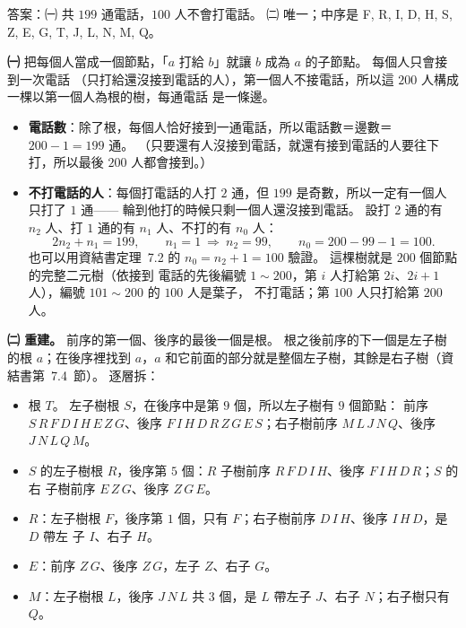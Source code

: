 \begin{pastsoln}
答案：㈠ 共 $199$ 通電話，$100$ 人不會打電話。 ㈡ 唯一；中序是 F, R, I, D, H, S, Z, E, G, T, J, L, N, M, Q。

\textbf{㈠} 把每個人當成一個節點，「$a$ 打給 $b$」就讓 $b$ 成為 $a$ 的子節點。 每個人只會接到一次電話
（只打給還沒接到電話的人），第一個人不接電話，所以這 $200$ 人構成一棵以第一個人為根的樹，每通電話
是一條邊。
\begin{itemize}
\item \textbf{電話數}：除了根，每個人恰好接到一通電話，所以電話數＝邊數＝$200 - 1 = 199$ 通。
（只要還有人沒接到電話，就還有接到電話的人要往下打，所以最後 $200$ 人都會接到。）
\item \textbf{不打電話的人}：每個打電話的人打 $2$ 通，但 $199$ 是奇數，所以一定有一個人只打了 $1$ 通——
輪到他打的時候只剩一個人還沒接到電話。 設打 $2$ 通的有 $n_2$ 人、打 $1$ 通的有 $n_1$ 人、不打的有
$n_0$ 人：
\[
2n_2 + n_1 = 199,\qquad n_1 = 1 \ \Rightarrow\ n_2 = 99,\qquad n_0 = 200 - 99 - 1 = 100.
\]
也可以用資結書定理~7.2 的 $n_0 = n_2 + 1 = 100$ 驗證。 這棵樹就是 $200$ 個節點的完整二元樹（依接到
電話的先後編號 $1 \sim 200$，第 $i$ 人打給第 $2i$、$2i+1$ 人），編號 $101 \sim 200$ 的 $100$ 人是葉子，
不打電話；第 $100$ 人只打給第 $200$ 人。
\end{itemize}

\textbf{㈡ 重建。} 前序的第一個、後序的最後一個是根。 根之後前序的下一個是左子樹的根 $a$；在後序裡找到
$a$，$a$ 和它前面的部分就是整個左子樹，其餘是右子樹（資結書第~7.4~節）。 逐層拆：
\begin{itemize}
\item 根 $T$。 左子樹根 $S$，在後序中是第 $9$ 個，所以左子樹有 $9$ 個節點：
前序 $S\,R\,F\,D\,I\,H\,E\,Z\,G$、後序 $F\,I\,H\,D\,R\,Z\,G\,E\,S$；右子樹前序 $M\,L\,J\,N\,Q$、後序
$J\,N\,L\,Q\,M$。
\item $S$ 的左子樹根 $R$，後序第 $5$ 個：$R$ 子樹前序 $R\,F\,D\,I\,H$、後序 $F\,I\,H\,D\,R$；$S$ 的右
子樹前序 $E\,Z\,G$、後序 $Z\,G\,E$。
\item $R$：左子樹根 $F$，後序第 $1$ 個，只有 $F$；右子樹前序 $D\,I\,H$、後序 $I\,H\,D$，是 $D$ 帶左
子 $I$、右子 $H$。
\item $E$：前序 $Z\,G$、後序 $Z\,G$，左子 $Z$、右子 $G$。
\item $M$：左子樹根 $L$，後序 $J\,N\,L$ 共 $3$ 個，是 $L$ 帶左子 $J$、右子 $N$；右子樹只有 $Q$。
\end{itemize}
\begin{center}
\end{center}


\end{pastsoln}
